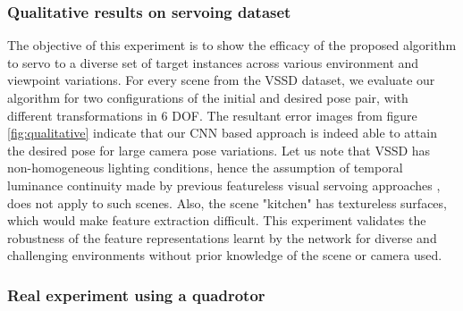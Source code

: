 \documentclass[usletter, 10 pt, conference]{ieeeconf}  %
\begin{document}
\subsubsection{Qualitative results on servoing dataset}
The objective of this experiment is to show the efficacy of the proposed algorithm to servo to a diverse set of target instances across various environment and viewpoint variations. For every scene from the VSSD dataset, we evaluate our algorithm for two configurations of the initial and desired pose pair, with different transformations in $6$ DOF. The resultant error images from figure \ref{fig:qualitative} indicate that our CNN based approach is indeed able to attain the desired pose for large camera pose variations. Let us note that VSSD has non-homogeneous lighting conditions, hence the assumption of temporal luminance continuity made by previous featureless visual servoing approaches \cite{photometricvs}, \cite{gradientvs} does not apply to such scenes. Also, the scene "kitchen" has textureless surfaces, which would make feature extraction difficult. This experiment validates the robustness of the feature representations learnt by the network for diverse and challenging environments without prior knowledge of the scene or camera used. 

\subsubsection{Real experiment using a quadrotor}
\end{document}
